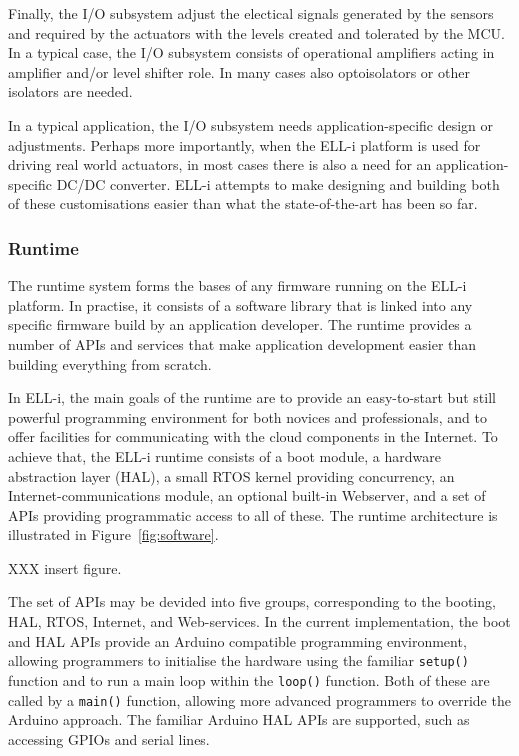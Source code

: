 \documentclass[draft,a4paper]{siamltex}
\begin{document}
Finally, the I/O subsystem adjust the electical signals generated by
the sensors and required by the actuators with the levels created and
tolerated by the MCU.  In a typical case, the I/O subsystem consists
of operational amplifiers acting in amplifier and/or level shifter
role.  In many cases also optoisolators or other isolators are needed.

In a typical application, the I/O subsystem needs application-specific
design or adjustments.  Perhaps more importantly, when the ELL-i
platform is used for driving real world actuators, in most cases there
is also a need for an application-specific DC/DC converter.  ELL-i
attempts to make designing and building both of these customisations
easier than what the state-of-the-art has been so far.

\subsubsection{Runtime}

The runtime system forms the bases of any firmware running on the
ELL-i platform.  In practise, it consists of a software library that
is linked into any specific firmware build by an application
developer.  The runtime provides a number of APIs and services that make
application development easier than building everything from scratch.

In ELL-i, the main goals of the runtime are to provide an
easy-to-start but still powerful programming environment for both
novices and professionals, and to offer facilities for communicating
with the cloud components in the Internet.  To achieve that, the ELL-i
runtime consists of a boot module, a hardware abstraction layer (HAL),
a small RTOS kernel providing concurrency, an Internet-communications
module, an optional built-in Webserver, and a set of APIs providing
programmatic access to all of these.  The runtime architecture is
illustrated in Figure~\ref{fig:software}.

XXX insert figure.

The set of APIs may be devided into five groups, corresponding to the
booting, HAL, RTOS, Internet, and Web-services.  In the current
implementation, the boot and HAL APIs provide an Arduino compatible
programming environment, allowing programmers to initialise the
hardware using the familiar \hbox{\tt setup()} function and to run a
main loop within the \hbox{\tt loop()} function.  Both of these are
called by a \hbox{\tt main()} function, allowing more advanced
programmers to override the Arduino approach.  The familiar Arduino
HAL APIs are supported, such as accessing GPIOs and serial lines.
\end{document}
